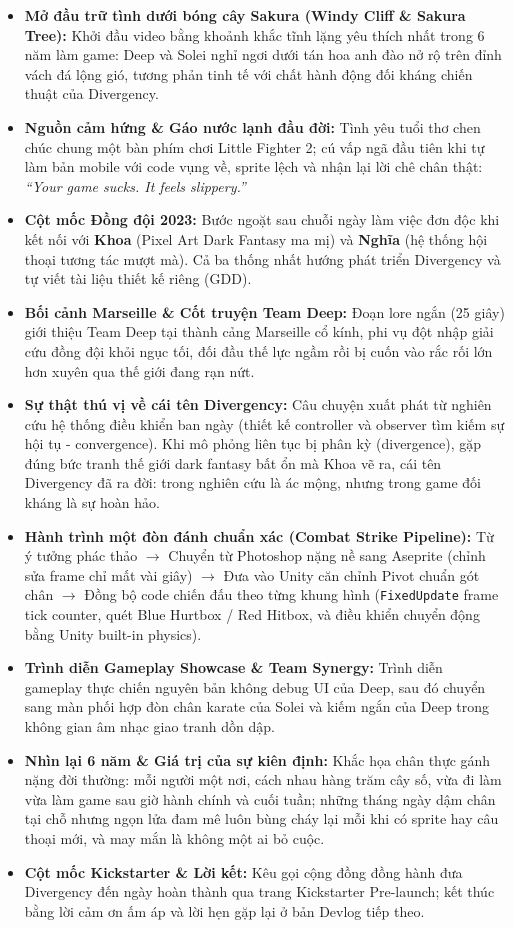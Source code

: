 \documentclass[11pt,a4paper]{article}
\begin{document}
\begin{itemize}
    \item \textbf{Mở đầu trữ tình dưới bóng cây Sakura (Windy Cliff \& Sakura Tree):} Khởi đầu video bằng khoảnh khắc tĩnh lặng yêu thích nhất trong 6 năm làm game: Deep và Solei nghỉ ngơi dưới tán hoa anh đào nở rộ trên đỉnh vách đá lộng gió, tương phản tinh tế với chất hành động đối kháng chiến thuật của Divergency.
    \item \textbf{Nguồn cảm hứng \& Gáo nước lạnh đầu đời:} Tình yêu tuổi thơ chen chúc chung một bàn phím chơi Little Fighter 2; cú vấp ngã đầu tiên khi tự làm bản mobile với code vụng về, sprite lệch và nhận lại lời chê chân thật: \textit{“Your game sucks. It feels slippery.”}
    \item \textbf{Cột mốc Đồng đội 2023:} Bước ngoặt sau chuỗi ngày làm việc đơn độc khi kết nối với \textbf{Khoa} (Pixel Art Dark Fantasy ma mị) và \textbf{Nghĩa} (hệ thống hội thoại tương tác mượt mà). Cả ba thống nhất hướng phát triển Divergency và tự viết tài liệu thiết kế riêng (GDD).
    \item \textbf{Bối cảnh Marseille \& Cốt truyện Team Deep:} Đoạn lore ngắn (25 giây) giới thiệu Team Deep tại thành cảng Marseille cổ kính, phi vụ đột nhập giải cứu đồng đội khỏi ngục tối, đối đầu thế lực ngầm rồi bị cuốn vào rắc rối lớn hơn xuyên qua thế giới đang rạn nứt.
    \item \textbf{Sự thật thú vị về cái tên Divergency:} Câu chuyện xuất phát từ nghiên cứu hệ thống điều khiển ban ngày (thiết kế controller và observer tìm kiếm sự hội tụ - convergence). Khi mô phỏng liên tục bị phân kỳ (divergence), gặp đúng bức tranh thế giới dark fantasy bất ổn mà Khoa vẽ ra, cái tên Divergency đã ra đời: trong nghiên cứu là ác mộng, nhưng trong game đối kháng là sự hoàn hảo.
    \item \textbf{Hành trình một đòn đánh chuẩn xác (Combat Strike Pipeline):} Từ ý tưởng phác thảo $\rightarrow$ Chuyển từ Photoshop nặng nề sang Aseprite (chỉnh sửa frame chỉ mất vài giây) $\rightarrow$ Đưa vào Unity căn chỉnh Pivot chuẩn gót chân $\rightarrow$ Đồng bộ code chiến đấu theo từng khung hình (\texttt{FixedUpdate} frame tick counter, quét Blue Hurtbox / Red Hitbox, và điều khiển chuyển động bằng Unity built-in physics).
    \item \textbf{Trình diễn Gameplay Showcase \& Team Synergy:} Trình diễn gameplay thực chiến nguyên bản không debug UI của Deep, sau đó chuyển sang màn phối hợp đòn chân karate của Solei và kiếm ngắn của Deep trong không gian âm nhạc giao tranh dồn dập.
    \item \textbf{Nhìn lại 6 năm \& Giá trị của sự kiên định:} Khắc họa chân thực gánh nặng đời thường: mỗi người một nơi, cách nhau hàng trăm cây số, vừa đi làm vừa làm game sau giờ hành chính và cuối tuần; những tháng ngày dậm chân tại chỗ nhưng ngọn lửa đam mê luôn bùng cháy lại mỗi khi có sprite hay câu thoại mới, và may mắn là không một ai bỏ cuộc.
    \item \textbf{Cột mốc Kickstarter \& Lời kết:} Kêu gọi cộng đồng đồng hành đưa Divergency đến ngày hoàn thành qua trang Kickstarter Pre-launch; kết thúc bằng lời cảm ơn ấm áp và lời hẹn gặp lại ở bản Devlog tiếp theo.
\end{itemize}
\end{document}
